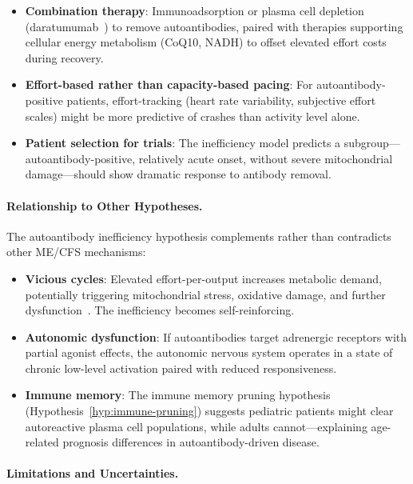 \begin{speculation}
\begin{itemize}
    \item \textbf{Combination therapy}: Immunoadsorption or plasma cell depletion (daratumumab~\cite{Fluge2025daratumumab}) to remove autoantibodies, paired with therapies supporting cellular energy metabolism (CoQ10, NADH) to offset elevated effort costs during recovery.

    \item \textbf{Effort-based rather than capacity-based pacing}: For autoantibody-positive patients, effort-tracking (heart rate variability, subjective effort scales) might be more predictive of crashes than activity level alone.

    \item \textbf{Patient selection for trials}: The inefficiency model predicts a subgroup---autoantibody-positive, relatively acute onset, without severe mitochondrial damage---should show dramatic response to antibody removal.
\end{itemize}

\paragraph{Relationship to Other Hypotheses.}

The autoantibody inefficiency hypothesis complements rather than contradicts other ME/CFS mechanisms:

\begin{itemize}
    \item \textbf{Vicious cycles}: Elevated effort-per-output increases metabolic demand, potentially triggering mitochondrial stress, oxidative damage, and further dysfunction~\cite{Scheibenbogen2025muscle}. The inefficiency becomes self-reinforcing.

    \item \textbf{Autonomic dysfunction}: If autoantibodies target adrenergic receptors with partial agonist effects, the autonomic nervous system operates in a state of chronic low-level activation paired with reduced responsiveness.

    \item \textbf{Immune memory}: The immune memory pruning hypothesis (Hypothesis~\ref{hyp:immune-pruning}) suggests pediatric patients might clear autoreactive plasma cell populations, while adults cannot---explaining age-related prognosis differences in autoantibody-driven disease.
\end{itemize}

\paragraph{Limitations and Uncertainties.}


\end{speculation}
